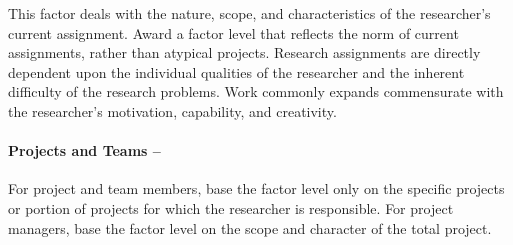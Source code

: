 %


This factor deals with the nature, scope, and characteristics of the researcher's current assignment.
Award a factor level that reflects the norm of current assignments,
rather than atypical projects.
Research assignments are directly dependent upon the individual
qualities of the researcher and the inherent difficulty of the
research problems.
Work commonly expands commensurate with the researcher's motivation,
capability, and creativity. \\

\paragraph*{\textbf{Projects and Teams -- }}  For project and team members, base the factor
level only on the specific projects or portion of projects for which
the researcher is responsible.
For project managers, base the factor level on the scope and character
of the total project.

